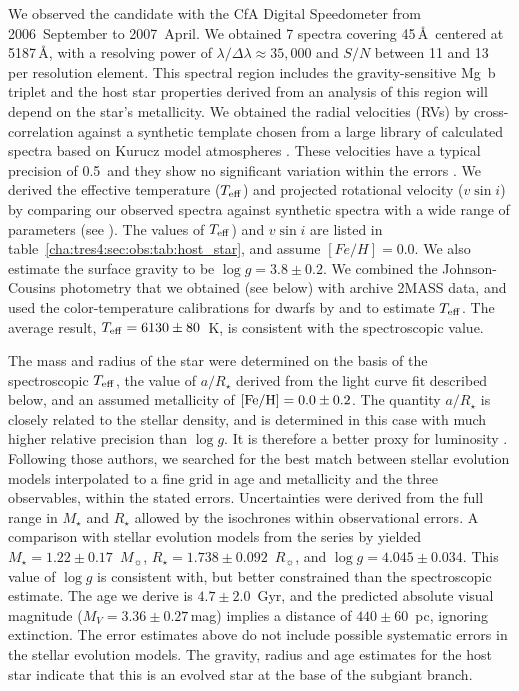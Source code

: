 We observed the candidate with the CfA Digital Speedometer \citep{Latham:ASP:1992a} from 2006~September to 2007~April.
We obtained 7 spectra covering 45\,\AA\ centered
at 5187\,\AA, with a resolving power of
$\lambda/\Delta\lambda \approx 35,\!000$ and $S/N$ between 11 and 13 per resolution element.
This spectral region includes the gravity-sensitive Mg~b triplet and the host star properties derived from an analysis of this region will depend on the star's metallicity.
We obtained the radial velocities (RVs) by
cross-correlation against a synthetic template chosen from a large library of
calculated spectra based on Kurucz model atmospheres
\citep[see][]{Nordstroem_Latham_Morse:aa:1994a, Latham_Stefanik_Torres:aj:2002a}.
These velocities have a typical precision of
0.5~\kms and they show no significant variation within the errors
. We derived the effective temperature ($T_{\rm eff}$) and projected rotational velocity ($v\sin{i}$) by comparing our observed spectra against synthetic spectra with a wide range of parameters (see \citealt*{Torres_Neuhauser_Guenther:aj:2002a}). The values of $T_{\rm eff}$) and $v \sin i$ are listed in table~\ref{cha:tres4:sec:obs:tab:host_star}, and assume $[Fe/H]=0.0$. We also estimate the surface gravity to be \mbox{$\log g = 3.8 \pm 0.2$}.
We combined the Johnson-Cousins photometry that we obtained (see
below) with archive 2MASS data, and used the
color-temperature calibrations for dwarfs by \citet{Ramirez_Melendez:apj:2005b} and \citet*{Casagrande_Portinari_Flynn:mnras:2006a} to estimate
$T_{\rm eff}$. The average result, $T_{\rm eff} = 6130 \pm 80$~K,
is consistent with the spectroscopic value.

The mass and radius of the star were determined on the basis of the spectroscopic $T_{\rm eff}$,
the value of $a/R_{\star}$ derived from the light curve fit described below, and
an assumed metallicity of $\left [ {\rm Fe/H} \right ] = 0.0 \pm 0.2$. The
quantity $a/R_{\star}$ is closely related to the stellar density, and is
determined in this case with much higher relative precision than $\log g$. It
is therefore a better proxy for luminosity \citep[see][]{Sozzetti_Torres_Charbonneau:apj:2007a}.
Following those authors, we searched for the best match between stellar evolution models interpolated to a fine grid in age and metallicity and the three observables,
within the stated errors.
Uncertainties were derived from the full range in $M_\star$ and $R_\star$ allowed by the isochrones within observational errors.
A comparison with stellar evolution models from the series by \citet{Yi_Demarque_Kim:apjs:2001a} yielded \mbox{$M_{\star} = 1.22 \pm 0.17$~$M_{\sun}$}, \mbox{$R_{\star} = 1.738 \pm 0.092$~$R_{\sun}$}, and
\mbox{$\log g = 4.045 \pm 0.034$}. This value of $\log g$ is consistent with, but
better constrained than the spectroscopic estimate. The age we derive is
$4.7 \pm 2.0$~Gyr, and the predicted absolute visual magnitude
(\mbox{$M_V = 3.36 \pm 0.27$}\,mag) implies a distance of \mbox{$440 \pm 60$~pc}, ignoring extinction.
The error estimates above do not include possible systematic errors in the stellar evolution models.
The gravity, radius and age estimates for the host star indicate that this is an evolved star at the base of the subgiant branch.

